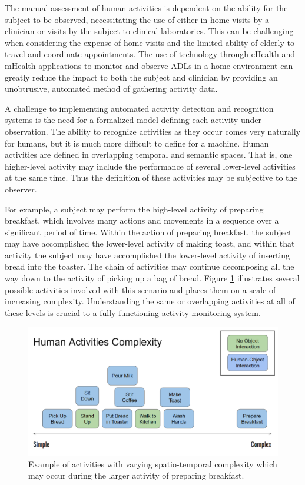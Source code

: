\documentclass[12pt]{report}
\begin{document}
The manual assessment of human activities is dependent on the ability for the subject to be observed, necessitating the use of either in-home visits by a clinician or visits by the subject to clinical laboratories. This can be challenging when considering the expense of home visits and the limited ability of elderly to travel and coordinate appointments. The use of technology through eHealth and mHealth applications to monitor and observe ADLs in a home environment can greatly reduce the impact to both the subject and clinician by providing an unobtrusive, automated method of gathering activity data.

A challenge to implementing automated activity detection and recognition systems is the need for a formalized model defining each activity under observation. The ability to recognize activities as they occur comes very naturally for humans, but it is much more difficult to define for a machine. Human activities are defined in overlapping temporal and semantic spaces. That is, one higher-level activity may include the performance of several lower-level activities at the same time. Thus the definition of these activities may be subjective to the observer. 

For example, a subject may perform the high-level activity of preparing breakfast, which involves many actions and movements in a sequence over a significant period of time. Within the action of preparing breakfast, the subject may have accomplished the lower-level activity of making toast, and within that activity the subject may have accomplished the lower-level activity of inserting bread into the toaster. The chain of activities may continue decomposing all the way down to the activity of picking up a bag of bread. Figure \ref{fig:activity_scale} illustrates several possible activities involved with this scenario and places them on a scale of increasing complexity. Understanding the same or overlapping activities at all of these levels is crucial to a fully functioning activity monitoring system.

\begin{figure}
    \centering
    \includegraphics[width=\linewidth]{figure/activity_scale.png}
    \caption{Example of activities with varying spatio-temporal complexity which may occur during the larger activity of preparing breakfast.}
    \label{fig:activity_scale}
\end{figure}
\end{document}

